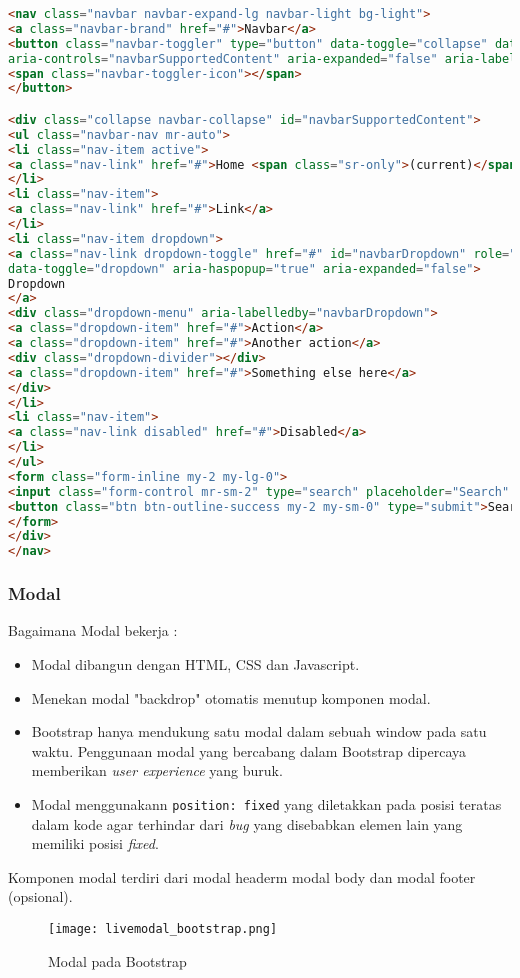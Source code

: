 \begin{lstlisting}[language=HTML,  basicstyle=\ttfamily, frame=single, columns=fullflexible, keepspaces=true, breaklines=true, showstringspaces=false, label={lst:navBarBootstrap}, caption=Navigation bar pada bootstrap 4.]  
<nav class="navbar navbar-expand-lg navbar-light bg-light">
<a class="navbar-brand" href="#">Navbar</a>
<button class="navbar-toggler" type="button" data-toggle="collapse" data-target="#navbarSupportedContent" 
aria-controls="navbarSupportedContent" aria-expanded="false" aria-label="Toggle navigation">
<span class="navbar-toggler-icon"></span>
</button>

<div class="collapse navbar-collapse" id="navbarSupportedContent">
<ul class="navbar-nav mr-auto">
<li class="nav-item active">
<a class="nav-link" href="#">Home <span class="sr-only">(current)</span></a>
</li>
<li class="nav-item">
<a class="nav-link" href="#">Link</a>
</li>
<li class="nav-item dropdown">
<a class="nav-link dropdown-toggle" href="#" id="navbarDropdown" role="button" 
data-toggle="dropdown" aria-haspopup="true" aria-expanded="false">
Dropdown
</a>
<div class="dropdown-menu" aria-labelledby="navbarDropdown">
<a class="dropdown-item" href="#">Action</a>
<a class="dropdown-item" href="#">Another action</a>
<div class="dropdown-divider"></div>
<a class="dropdown-item" href="#">Something else here</a>
</div>
</li>
<li class="nav-item">
<a class="nav-link disabled" href="#">Disabled</a>
</li>
</ul>
<form class="form-inline my-2 my-lg-0">
<input class="form-control mr-sm-2" type="search" placeholder="Search" aria-label="Search">
<button class="btn btn-outline-success my-2 my-sm-0" type="submit">Search</button>
</form>
</div>
</nav>
\end{lstlisting}

\subsubsection{Modal}
Bagaimana Modal bekerja :
\begin{itemize}
	\item Modal dibangun dengan HTML, CSS dan Javascript. 
	\item Menekan modal "backdrop" otomatis menutup komponen modal.
	\item Bootstrap hanya mendukung satu modal dalam sebuah window pada satu waktu. Penggunaan modal yang bercabang dalam Bootstrap dipercaya memberikan \textit{user experience} yang buruk.
	\item Modal menggunakann \texttt{position: fixed} yang diletakkan pada posisi teratas dalam kode agar terhindar dari \textit{bug} yang disebabkan elemen lain yang memiliki posisi \textit{fixed}. 
\end{itemize}
Komponen modal terdiri dari modal headerm modal body dan modal footer (opsional).
\begin{figure} [H]
	\centering  
	\texttt{[image: livemodal\_bootstrap.png]}  
	\caption{Modal pada Bootstrap} 
	\label{fig:modalBootstrap}
\end{figure}

